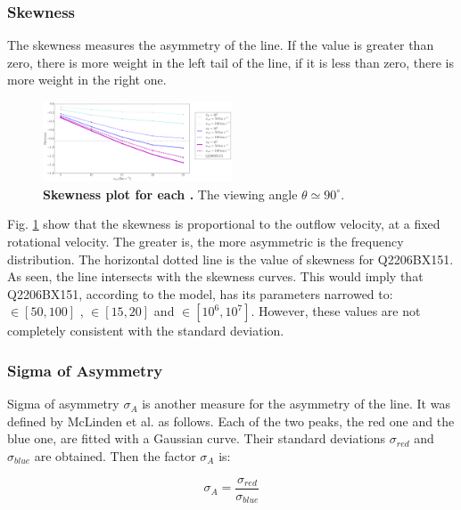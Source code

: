 \documentclass[twocolappendix]{latex/emulateapj}
\begin{document}
\subsubsection{Skewness}
The skewness measures the asymmetry of the \lya line. If the value is greater than zero, there is more weight in the left tail of the line, if it is less than zero, there is more weight in the right one.\\

\begin{figure}[h!]
	\begin{center}
		\includegraphics[width=0.5\textwidth]{./figures/skw}
	\end{center}
	\caption{\textbf{Skewness plot for each \tauh.} The viewing angle $\theta \simeq 90^\circ$. 
		\label{fig:skw}}
\end{figure}

Fig. \ref{fig:skw} show that the skewness is proportional to the outflow velocity, at a fixed rotational velocity. The greater \vout is, the more asymmetric is the \lya frequency distribution. The horizontal dotted line is the value of skewness for Q2206BX151. As seen, the line intersects with the skewness curves. This would imply that Q2206BX151, according to the model, has its parameters narrowed to: \vrot $\in [50,100]$ \kms, \vout $\in [15,20]$ \kms and \tauh $\in [10^6, 10^7]$. However, these values are not completely consistent with the standard deviation.\\

\subsubsection{Sigma of Asymmetry}
Sigma of asymmetry $\sigma_A$ is another measure for the asymmetry of the \lya line. It was defined by McLinden et al. \cite{McLinden2011} as follows. Each of the two peaks, the red one and the blue one, are fitted with a Gaussian curve. Their standard deviations $\sigma_{red}$ and $\sigma_{blue}$ are obtained. Then the factor $\sigma_A$ is:

\begin{equation}
\sigma_A = \frac{\sigma_{red}}{\sigma_{blue}}
\end{equation}
\end{document}
